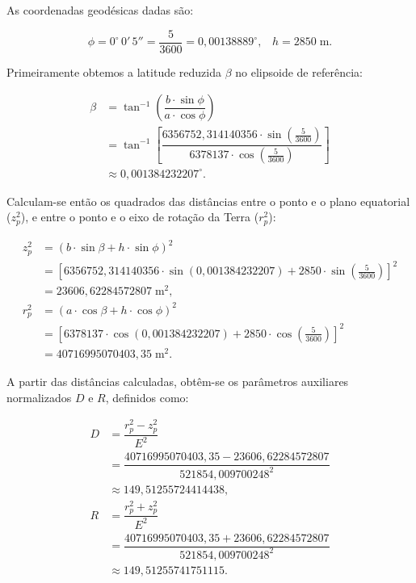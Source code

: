 \noindent
As coordenadas geodésicas dadas são:

\[
\phi = 0^\circ\,0'\,5'' = \dfrac{5}{3600} = 0{,}00138889^\circ \text{,} \quad h = 2850 \; \text{m} \text{.}
\]

\noindent
Primeiramente obtemos a latitude reduzida \(\beta\) no elipsoide de referência:

\[
\begin{aligned}
   \beta &= \tan^{-1}\left( \dfrac{b \cdot \sin \phi}{a \cdot \cos \phi} \right) \\
         &= \tan^{-1}\left[ \dfrac{6356752{,}314140356 \cdot \sin\left(\tfrac{5}{3600}\right)}{6378137 \cdot \cos\left(\tfrac{5}{3600}\right)} \right] \\
         &\approx 0{,}001384232207^\circ \text{.}
\end{aligned}
\]

\noindent
Calculam-se então os quadrados das distâncias entre o ponto e o plano equatorial (\(z_p^2\)), e entre o ponto e o eixo de rotação da Terra (\(r_p^2\)):



\[
\begin{aligned}
   z_p^2 &= \left( b \cdot \sin\beta + h \cdot \sin\phi \right)^2 \\
         &= \left[ 6356752{,}314140356 \cdot \sin(0{,}001384232207) + 2850 \cdot \sin\left(\tfrac{5}{3600}\right) \right]^2 \\
         &= 23606{,}62284572807 \; \text{m}^2 \text{,} \\
   r_p^2 &= \left( a \cdot \cos\beta + h \cdot \cos\phi \right)^2 \\
         &= \left[6378137 \cdot \cos(0{,}001384232207) + 2850 \cdot \cos\left(\tfrac{5}{3600}\right)\right]^2 \\
         &= 40716995070403{,}35 \; \text{m}^2 \text{.}
\end{aligned}
\]

\noindent
A partir das distâncias calculadas, obtêm-se os parâmetros auxiliares normalizados \(D\) e \(R\), definidos como:


\[
\begin{aligned}
   D &= \dfrac{r_p^2 - z_p^2}{E^2} \\
     &= \dfrac{40716995070403{,}35 - 23606{,}62284572807}{521854{,}009700248^2} \\
     &\approx 149{,}51255724414438 \text{,} \\
   R &= \dfrac{r_p^2 + z_p^2}{E^2} \\
     &= \dfrac{40716995070403{,}35 + 23606{,}62284572807}{521854{,}009700248^2} \\
     &\approx 149{,}51255741751115 \text{.}
\end{aligned}
\]

